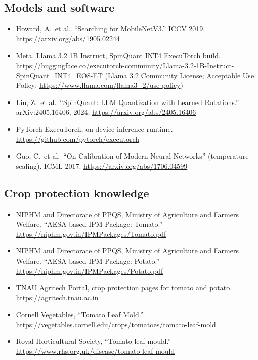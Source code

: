 \documentclass[11pt,a4paper]{article}
\begin{document}
\subsection*{Models and software}

\begin{itemize}[label={},leftmargin=2.4em,labelsep=0.45em,itemsep=0.3em]
  \item[{[8]}] Howard, A.\ et al.\ ``Searching for MobileNetV3.'' ICCV 2019. \url{https://arxiv.org/abs/1905.02244}
  \item[{[9]}] Meta. Llama 3.2 1B Instruct, SpinQuant INT4 ExecuTorch build. \url{https://huggingface.co/executorch-community/Llama-3.2-1B-Instruct-SpinQuant_INT4_EO8-ET} (Llama 3.2 Community License; Acceptable Use Policy: \url{https://www.llama.com/llama3_2/use-policy})
  \item[{[10]}] Liu, Z.\ et al.\ ``SpinQuant: LLM Quantization with Learned Rotations.'' arXiv:2405.16406, 2024. \url{https://arxiv.org/abs/2405.16406}
  \item[{[11]}] PyTorch ExecuTorch, on-device inference runtime. \url{https://github.com/pytorch/executorch}
  \item[{[12]}] Guo, C.\ et al.\ ``On Calibration of Modern Neural Networks'' (temperature scaling). ICML 2017. \url{https://arxiv.org/abs/1706.04599}
\end{itemize}

\subsection*{Crop protection knowledge}

\begin{itemize}[label={},leftmargin=2.4em,labelsep=0.45em,itemsep=0.3em]
  \item[{[13]}] NIPHM and Directorate of PPQS, Ministry of Agriculture and Farmers Welfare. ``AESA based IPM Package: Tomato.'' \url{https://niphm.gov.in/IPMPackages/Tomato.pdf}
  \item[{[14]}] NIPHM and Directorate of PPQS, Ministry of Agriculture and Farmers Welfare. ``AESA based IPM Package: Potato.'' \url{https://niphm.gov.in/IPMPackages/Potato.pdf}
  \item[{[15]}] TNAU Agritech Portal, crop protection pages for tomato and potato. \url{https://agritech.tnau.ac.in}
  \item[{[16]}] Cornell Vegetables, ``Tomato Leaf Mold.'' \url{https://vegetables.cornell.edu/crops/tomatoes/tomato-leaf-mold}
  \item[{[17]}] Royal Horticultural Society, ``Tomato leaf mould.'' \url{https://www.rhs.org.uk/disease/tomato-leaf-mould}
\end{itemize}
\end{document}
